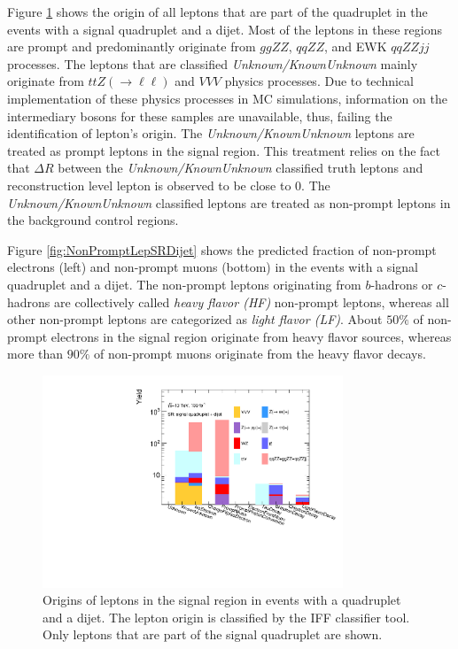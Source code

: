 Figure \ref{fig:LeptonCompositionSRVBS} shows the origin of all leptons that are part of the quadruplet in the events with a signal quadruplet and a dijet. Most of the leptons in these regions are prompt and predominantly originate from $ggZZ$, $qqZZ$, and EWK $qqZZjj$ processes. The leptons that are classified \textit{Unknown/KnownUnknown} mainly originate from $ttZ(\rightarrow \ell \ell)$ and $VVV$ physics processes. Due to technical implementation of these physics processes in MC simulations, information on the intermediary bosons for these samples are unavailable, thus, failing the identification of lepton's origin. The \textit{Unknown/KnownUnknown} leptons are treated as prompt leptons in the signal region. This treatment relies on the fact that $\Delta R$ between the \textit{Unknown/KnownUnknown} classified truth leptons and reconstruction level lepton is observed to be close to $0$. The \textit{Unknown/KnownUnknown} classified leptons are treated as non-prompt leptons in the background control regions. 

Figure \ref{fig:NonPromptLepSRDijet} shows the predicted fraction of non-prompt electrons (left) and non-prompt muons (bottom) in the events with a signal quadruplet and a dijet. The non-prompt leptons originating from $b$-hadrons or $c$-hadrons are collectively called \textit{heavy flavor (HF)} non-prompt leptons, whereas all other non-prompt leptons are categorized as \textit{light flavor (LF)}. About $50\%$ of non-prompt electrons in the signal region originate from heavy flavor sources, whereas more than $90\%$ of non-prompt muons originate from the heavy flavor decays.

\begin{figure}[!htb]
    \centering
    \includegraphics[width = 0.8\textwidth]{figures/Analysis/Background/AllLeptonSRDijetComposition.pdf}
    \caption{ Origins of leptons in the signal region in events with a quadruplet and a dijet. The lepton origin is classified by the IFF classifier tool. Only leptons that are part of the signal quadruplet are shown.\label{fig:LeptonCompositionSRVBS}}
\end{figure}


